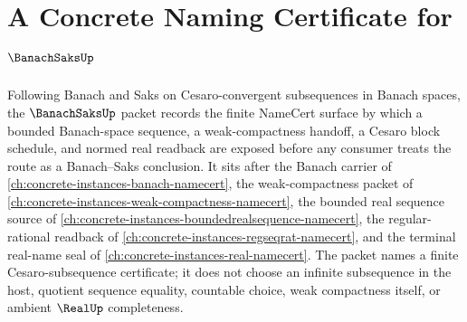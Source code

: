 \chapter{A Concrete Naming Certificate for $\BanachSaksUp$}
\label{ch:concrete-instances-banach-saks-namecert}

Following Banach and Saks on Cesaro-convergent subsequences in Banach spaces, the $\BanachSaksUp$ packet records the finite NameCert surface by which a bounded Banach-space sequence, a weak-compactness handoff, a Cesaro block schedule, and normed real readback are exposed before any consumer treats the route as a Banach--Saks conclusion. It sits after the Banach carrier of \autoref{ch:concrete-instances-banach-namecert}, the weak-compactness packet of \autoref{ch:concrete-instances-weak-compactness-namecert}, the bounded real sequence source of \autoref{ch:concrete-instances-boundedrealsequence-namecert}, the regular-rational readback of \autoref{ch:concrete-instances-regseqrat-namecert}, and the terminal real-name seal of \autoref{ch:concrete-instances-real-namecert}. The packet names a finite Cesaro-subsequence certificate; it does not choose an infinite subsequence in the host, quotient sequence equality, countable choice, weak compactness itself, or ambient $\RealUp$ completeness.

